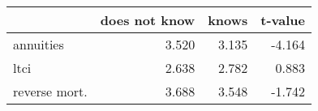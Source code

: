 \begin{tabular}{lrrr}
\toprule
{} &  does not know &  knows &  t-value \\
\midrule
annuities     &          3.520 &  3.135 &   -4.164 \\
ltci          &          2.638 &  2.782 &    0.883 \\
reverse mort. &          3.688 &  3.548 &   -1.742 \\
\bottomrule
\end{tabular}
